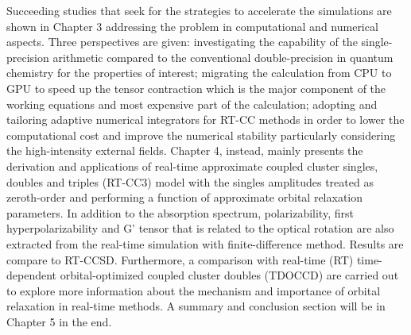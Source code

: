 Succeeding studies that seek for the strategies to accelerate the simulations
are shown in Chapter 3 addressing the problem in computational and numerical
aspects. Three perspectives are given: investigating the capability of the
single-precision arithmetic compared to the conventional double-precision in
quantum chemistry for the properties of interest; migrating the calculation
from CPU to GPU to speed up the tensor contraction which is the major component
of the working equations and most expensive part of the calculation; adopting
and tailoring adaptive numerical integrators for RT-CC methods in order to
lower the computational cost and improve the numerical stability particularly
considering the high-intensity external fields. Chapter 4, instead, mainly
presents the derivation and applications of real-time approximate coupled
cluster singles, doubles and triples (RT-CC3) model with the singles amplitudes
treated as zeroth-order and performing a function of  approximate orbital
relaxation parameters. In addition to the absorption spectrum, polarizability,
first hyperpolarizability and G’ tensor that is related to the optical rotation
are also extracted from the real-time simulation with finite-difference
method.\cite{Ding2013} Results are compare to RT-CCSD. Furthermore, a
comparison with real-time (RT) time-dependent orbital-optimized coupled cluster
doubles (TDOCCD)\cite{Krylov2000, Kristiansen2022} are carried out to explore
more information about the mechanism and importance of orbital relaxation in
real-time methods. A summary and conclusion section will be in Chapter 5 in the
end. 
